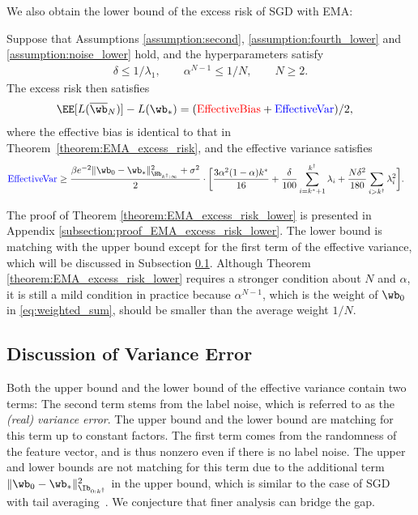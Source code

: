 \documentclass[11pt]{article}
\newcommand{\owb}{\overline{\wb}}
\begin{document}
We also obtain the lower bound of the excess risk of SGD with EMA:

\begin{theorem}\label{theorem:EMA_excess_risk_lower}
Suppose that Assumptions \ref{assumption:second}, \ref{assumption:fourth_lower} and \ref{assumption:noise_lower} hold, and the hyperparameters satisfy
\begin{align*}
\delta\le1/\lambda_1,\qquad\alpha^{N-1}\le1/N,\qquad N\ge2.
\end{align*}
The excess risk then satisfies
\begin{align*}
\EE[L(\owb_N)]-L(\wb_*)&=(\textcolor{red}{\mathrm{EffectiveBias}}+\textcolor{blue}{\mathrm{EffectiveVar}})/2,
\end{align*}
where the effective bias is identical to that in Theorem~\ref{theorem:EMA_excess_risk}, and the effective variance satisfies
\begin{align*}
&\textcolor{blue}{\mathrm{EffectiveVar}}\ge\frac{\beta e^{-2}\|\wb_0-\wb_*\|_{\Hb_{k^\dagger:\infty}}^2+\sigma^2}2\cdot\bigg[\frac{3\alpha^2(1-\alpha)k^*}{16}+\frac{\delta}{100}\sum_{i=k^*+1}^{k^\dagger}\lambda_i+\frac{N\delta^2}{180}\sum_{i>k^\dagger}\lambda_i^2\bigg].
\end{align*}
\end{theorem}
The proof of Theorem \ref{theorem:EMA_excess_risk_lower} is presented in Appendix \ref{subsection:proof_EMA_excess_risk_lower}. The lower bound is matching with the upper bound except for the first term of the effective variance, which will be discussed in Subsection \ref{subsection:var}. Although Theorem \ref{theorem:EMA_excess_risk_lower} requires a stronger condition about $N$ and $\alpha$, it is still a mild condition in practice because $\alpha^{N-1}$, which is the weight of $\wb_0$ in \eqref{eq:weighted_sum}, should be smaller than the average weight $1/N$.

\subsection{Discussion of Variance Error}\label{subsection:var}

Both the upper bound and the lower bound of the effective variance contain two terms:
The second term stems from the label noise, which is referred to as the \emph{(real) variance error}. The upper bound and the lower bound are matching for this term up to constant factors.
The first term comes from the randomness of the feature vector, and is thus nonzero even if there is no label noise. The upper and lower bounds are not matching for this term due to the additional term $\|\wb_0-\wb_*\|_{\Ib_{0:k^\dagger}}^2$ in the upper bound, which is similar to the case of SGD with tail averaging~\citep{zou2021benign}. We conjecture that finer analysis can bridge the gap.
\end{document}
